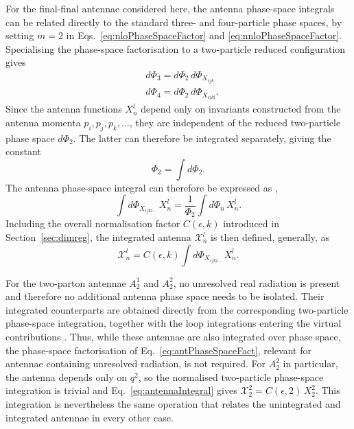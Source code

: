 For the final-final antennae considered here, the antenna phase-space
integrals can be related directly to the standard three- and four-particle
phase spaces, by setting $m=2$ in Eqs.~\eqref{eq:nloPhaseSpaceFactor} and \eqref{eq:nnloPhaseSpaceFactor}.
Specialising the phase-space factorisation to a two-particle reduced
configuration gives
\begin{equation}\label{eq:phi2Factor}
    \begin{split}
        &d\Phi_3 = d\Phi_2\,d\Phi_{X_{ijk}}\\
        &d\Phi_4 = d\Phi_2\,d\Phi_{X_{ijkl}}.
    \end{split}
\end{equation}
Since the antenna functions $X_n^l$ depend only on invariants constructed from
the antenna momenta $p_i,p_j,p_k,\ldots$, they are independent of the reduced
two-particle phase space $d\Phi_2$. The latter can therefore be integrated
separately, giving the constant
\begin{equation}
    \Phi_2=\int d\Phi_2.
\end{equation}
The antenna phase-space integral can therefore be expressed as
\cite{Gehrmann-DeRidder:2005btv},
\begin{equation}\label{eq:antPhaseSpaceFact}
    \int d\Phi_{X_{ijkl...}}\,X_n^l = \frac1{\Phi_2}\int d\Phi_n\,X_n^l.
\end{equation}
Including the overall normalisation factor $C(\epsilon,k)$ introduced in
Section~\ref{sec:dimreg}, the integrated antenna $\mathcal X_n^l$ is then
defined, generally, as
\begin{equation}\label{eq:antennaIntegral}
    \mathcal X_n^l = C(\epsilon, k) \int d\Phi_{X_{ijkl...}}\,X_n^l.
\end{equation}

For the two-parton antennae $A_2^1$ and $A_2^2$, no unresolved real radiation
is present and therefore no additional antenna phase space needs to be
isolated. Their integrated counterparts are obtained directly from the
corresponding two-particle phase-space integration, together with the loop
integrations entering the virtual contributions \cite{GehrmannDeRidder0507061}.
Thus, while these antennae are also integrated over phase space, the
phase-space factorisation of Eq.~\eqref{eq:antPhaseSpaceFact}, relevant for
antennae containing unresolved radiation, is not required. For $A_2^2$ in
particular, the antenna depends only on $q^2$, so the normalised two-particle
phase-space integration is trivial and Eq.~\eqref{eq:antennaIntegral} gives
$\mathcal X_2^2 = C(\epsilon,2)\,X_2^2$. This integration is nevertheless the same
operation that relates the unintegrated and integrated antennae in every other case.

